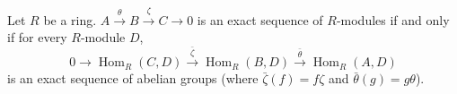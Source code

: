 Let $R$ be a ring. $A \xrightarrow{\theta} B \xrightarrow{\zeta} C \to 0$ is an exact sequence of $R$-modules if and only if for every $R$-module $D$,
\[
0 \to \operatorname{Hom}_R(C, D) \xrightarrow{\bar{\zeta}} \operatorname{Hom}_R(B, D) \xrightarrow{\bar{\theta}} \operatorname{Hom}_R(A, D)
\]
is an exact sequence of abelian groups (where $\bar{\zeta}(f) = f\zeta$ and $\bar{\theta}(g) = g\theta$).
